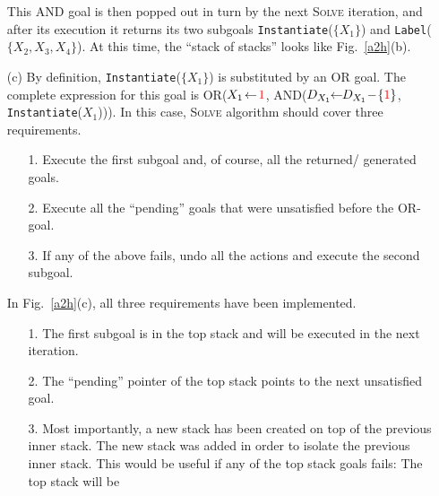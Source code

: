 \documentclass{ws-ijait}
\begin{document}
\begin{enumerate}
             This \textsf{AND} goal is then popped out in
             turn by the next \textsc{Solve} iteration, and
             after its execution it returns its two subgoals
             \texttt{Instantiate}($\{X_1\}$) and
             \texttt{Label}($\{X_2, X_3, X_4\}$). At this
             time, the ``stack of stacks'' looks like
             Fig.~\ref{a2h}(b).
  \item[(c)] By definition, \texttt{Instantiate}($\{X_1\}$)
             is substituted by an \textsf{OR} goal. The
             complete expression for this goal is
             \textsf{OR}($X_1 \! \gets \!
             \textcolor{red}{1}$, \textsf{AND}($D_{X_1} \!\!
             \gets \!\! D_{X_1} \! - \!
             \{\textcolor{red}{1}\}$,\,\texttt{Instantiate}($X_1$))).
             In this case, \textsc{Solve} algorithm should
             cover three requirements.
             \begin{enumerate}
               \item[1.] Execute the first subgoal and, of
                         course, all the returned\slash
                         generated goals.
               \item[2.] Execute all the ``pending'' goals
                         that were unsatisfied before the
                         \textsf{OR}-goal.
               \item[3.] If any of the above fails, undo all
                         the actions and execute the second
                         subgoal.
             \end{enumerate}
             In Fig.~\ref{a2h}(c), all three requirements
             have been implemented.
             \begin{enumerate}
               \item[1.] The first subgoal is in the top
                         stack and will be executed in the
                         next iteration.
               \item[2.] The ``pending'' pointer of the top
                         stack points to the next
                         unsatisfied goal.
               \item[3.] Most importantly, a new stack has
                         been created on top of the previous
                         inner stack. The new stack was
                         added in order to isolate the
                         previous inner stack. This would be
                         useful if any of the top stack
                         goals fails: The top stack will be

\end{enumerate}
\end{enumerate}
\end{document}
